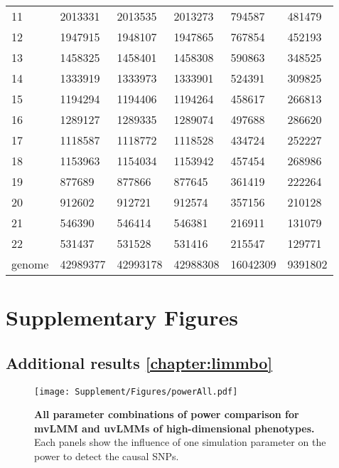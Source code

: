 \begin{table}[htbp]
\begin{tabular}{llllll}
    \num{11} & \num{2013331} & \num{2013535} & \num{2013273} & \num{794587} & \num{481479} \\
    \num{12} & \num{1947915} & \num{1948107} & \num{1947865} & \num{767854} & \num{452193} \\
    \num{13} & \num{1458325} & \num{1458401} & \num{1458308} & \num{590863} & \num{348525} \\
    \num{14} & \num{1333919} & \num{1333973} & \num{1333901} & \num{524391} & \num{309825} \\
    \num{15} & \num{1194294} & \num{1194406} & \num{1194264} & \num{458617} & \num{266813} \\
    \num{16} & \num{1289127} & \num{1289335} & \num{1289074} & \num{497688} & \num{286620} \\
    \num{17} & \num{1118587} & \num{1118772} & \num{1118528} & \num{434724} & \num{252227} \\
    \num{18} & \num{1153963} & \num{1154034} & \num{1153942} & \num{457454} & \num{268986} \\
    \num{19} & \num{877689} & \num{877866} & \num{877645} & \num{361419} & \num{222264} \\
    \num{20} & \num{912602} & \num{912721} & \num{912574} & \num{357156} & \num{210128} \\
    \num{21} & \num{546390} & \num{546414} & \num{546381} & \num{216911} & \num{131079} \\
    \num{22} & \num{531437} & \num{531528} & \num{531416} & \num{215547} & \num{129771} \\
    \midrule
    genome & \num{42989377} & \num{42993178} & \num{42988308} & \num{16042309} & \num{9391802} \\
    \bottomrule
    \end{tabular}%
  \label{tab:imputationQC}%
\end{table}%


\chapter{Supplementary Figures}
\newpage
\section{Additional results \cref{chapter:limmbo}}
\begin{figure}[hbtp]
	\centering
	\texttt{[image: Supplement/Figures/powerAll.pdf]}
		\caption[\textbf{All parameter combinations of power comparison for mvLMM and uvLMMs of high-dimensional phenotypes.}]{\textbf{All parameter combinations of power comparison for mvLMM and uvLMMs of high-dimensional phenotypes.} Each panels show the influence of one simulation parameter on the power to detect the causal SNPs.} 
	 	\label{fig:power-all}
\end{figure}

